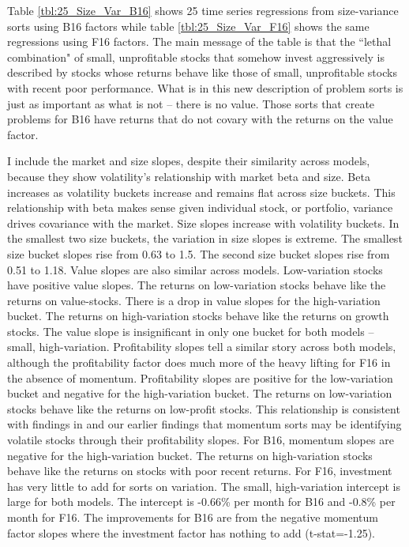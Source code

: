 
Table \ref{tbl:25_Size_Var_B16} shows 25 time series regressions
from size-variance sorts using B16 factors while table
\ref{tbl:25_Size_Var_F16} shows the same regressions using F16 factors.
The main message of the table is that the ``lethal combination" of small,
unprofitable stocks that somehow invest aggressively is described by stocks
whose returns behave like those of small, unprofitable stocks with recent poor
performance.
What is in this new description of problem sorts is just as important as what
is not -- there is no value.
Those sorts that create problems for B16 have returns that do not covary with
the returns on the value factor.

I include the market and size slopes, despite their similarity across models,
because they show volatility's relationship with market beta and size.
Beta increases as volatility buckets increase and remains flat across size
buckets.
This relationship with beta makes sense given individual stock, or portfolio,
variance drives covariance with the market.
Size slopes increase with volatility buckets.
In the smallest two size buckets, the variation in size slopes is extreme.
The smallest size bucket slopes rise from 0.63 to 1.5.
The second size bucket slopes rise from 0.51 to 1.18.
Value slopes are also similar across models.
Low-variation stocks have positive value slopes.
The returns on low-variation stocks behave like the returns on value-stocks.
There is a drop in value slopes for the high-variation bucket.
The returns on high-variation stocks behave like the returns on growth stocks.
The value slope is insignificant in only one bucket for both models --
small, high-variation.
Profitability slopes tell a similar story across both models, although the
profitability factor does much more of the heavy lifting for F16 in the absence
of momentum.
Profitability slopes are positive for the low-variation bucket and negative
for the high-variation bucket.
The returns on low-variation stocks behave like the returns on low-profit
stocks.
This relationship is consistent with findings in
\textcite{novy2014understanding} and our earlier findings that momentum sorts
may be identifying volatile stocks through their profitability slopes.
For B16, momentum slopes are negative for the high-variation bucket.
The returns on high-variation stocks behave like the returns on stocks with
poor recent returns.
For F16, investment has very little to add for sorts on variation.
The small, high-variation intercept is large for both models.
The intercept is -0.66\% per month for B16 and -0.8\% per month for F16.
The improvements for B16 are from the negative momentum factor slopes where the
investment factor has nothing to add (t-stat=-1.25).

